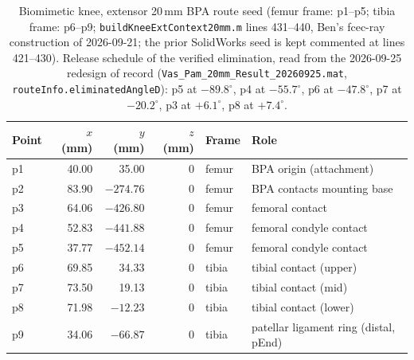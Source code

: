 \begin{table}
\caption{Biomimetic knee, extensor 20\,mm BPA route seed (femur frame: p1--p5; tibia frame: p6--p9; \texttt{buildKneeExtContext20mm.m} lines 431--440, Ben's fcec-ray construction of 2026-09-21; the prior SolidWorks seed is kept commented at lines 421--430). Release schedule of the verified elimination, read from the 2026-09-25 redesign of record (\texttt{Vas\_Pam\_20mm\_Result\_20260925.mat}, \texttt{routeInfo.eliminatedAngleD}): p5 at $-89.8^{\circ}$, p4 at $-55.7^{\circ}$, p6 at $-47.8^{\circ}$, p7 at $-20.2^{\circ}$, p3 at $+6.1^{\circ}$, p8 at $+7.4^{\circ}$.}
\label{tab:app_ext_seed}
\begin{tabular}{@{}lrrrll@{}}
\toprule
\textbf{Point} & $x$ (mm) & $y$ (mm) & $z$ (mm) & \textbf{Frame} & \textbf{Role} \\
\midrule
p1 & 40.00 & 35.00  & 0 & femur & BPA origin (attachment) \\
p2 & 83.90 & $-274.76$ & 0 & femur & BPA contacts mounting base \\
p3 & 64.06 & $-426.80$ & 0 & femur & femoral contact \\
p4 & 52.83 & $-441.88$ & 0 & femur & femoral condyle contact \\
p5 & 37.77 & $-452.14$ & 0 & femur & femoral condyle contact \\
p6 & 69.85 & 34.33  & 0 & tibia & tibial contact (upper) \\
p7 & 73.50 & 19.13  & 0 & tibia & tibial contact (mid) \\
p8 & 71.98 & $-12.23$ & 0 & tibia & tibial contact (lower) \\
p9 & 34.06 & $-66.87$ & 0 & tibia & patellar ligament ring (distal, pEnd) \\
\bottomrule
\end{tabular}
\end{table}

